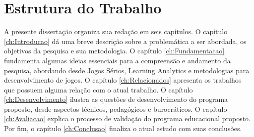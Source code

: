 




\vspace{-0.13cm}


\section{Estrutura do Trabalho}\label{ch:Estrutura}

A presente dissertação organiza sua redação em seis capítulos. O capítulo \ref{ch:Introducao} dá uma breve descrição sobre a problemática a ser abordada, os objetivos da pesquisa e sua metodologia. O capítulo \ref{ch:Fundamentacao} fundamenta algumas ideias essenciais para a compreensão e andamento da pesquisa, abordando desde Jogos Sérios, Learning Analytics e metodologias para desenvolvimento de jogos. O capítulo \ref{ch:Relacionados} apresenta os trabalhos que possuem alguma relação com o atual trabalho. O capítulo \ref{ch:Desenvolvimento} ilustra as questões de desenvolvimento do programa proposto, desde aspectos técnicos, pedagógicos e burocráticos. O capítulo \ref{ch:Avaliacao} explica o processo de validação do programa educacional proposto. Por fim, o capítulo \ref{ch:Conclusao} finaliza o atual estudo com suas conclusões.


